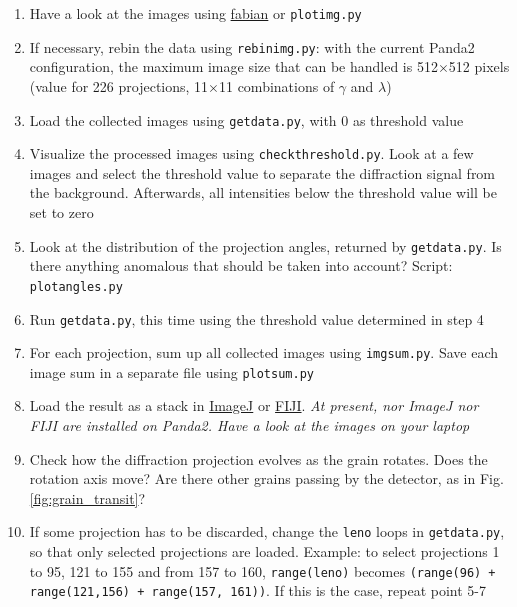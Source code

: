\documentclass[11pt]{scrartcl}
\begin{document}
\begin{enumerate}
    \item Have a look at the images using \href{https://sourceforge.net/p/fable/wiki/fabian/}{fabian} or {\texttt{plot\textunderscore img.py}}
    \item If necessary, rebin the data using {\texttt{rebin\textunderscore img.py}}: with the current Panda2 configuration, the maximum image size that can be handled is 512$\times$512 pixels (value for 226 projections, 11$\times$11 combinations of $\gamma$ and $\lambda$)
    \item Load the collected images using {\texttt{getdata.py}}, with 0 as threshold value
    \item Visualize the processed images using {\texttt{check\textunderscore threshold.py}}. Look at a few images and select the threshold value to separate the diffraction signal from the background. Afterwards, all intensities below the threshold value will be set to zero
    \item Look at the distribution of the projection angles, returned by {\texttt{getdata.py}}. Is there anything anomalous that should be taken into account? Script: {\texttt{plot\textunderscore angles.py}}
    \item Run {\texttt{getdata.py}}, this time using the threshold value determined in step 4
    \item For each projection, sum up all collected images using {\texttt{img\textunderscore sum.py}}. Save each image sum in a separate file using {\texttt{plot\textunderscore sum.py}}
    \item Load the result as a stack in \href{https://imagej.nih.gov/ij/}{ImageJ} or \href{https://imagej.net/Fiji}{\footnotesize{FIJI}}. {\emph{At present, nor ImageJ nor {\footnotesize{FIJI}} are installed on Panda2. Have a look at the images on your laptop}}
    \item Check how the diffraction projection evolves as the grain rotates. Does the rotation axis move? Are there other grains passing by the detector, as in Fig. \ref{fig:grain_transit}?
    \item If some projection has to be discarded, change the {\texttt{leno}} loops in {\texttt{getdata.py}}, so that only selected projections are loaded. Example: to select projections 1 to 95, 121 to 155 and from 157 to 160, {\texttt{range(leno)}} becomes {\texttt{(range(96) + range(121,156) + range(157, 161))}}. If this is the case, repeat point 5-7
\end{enumerate}
\end{document}
